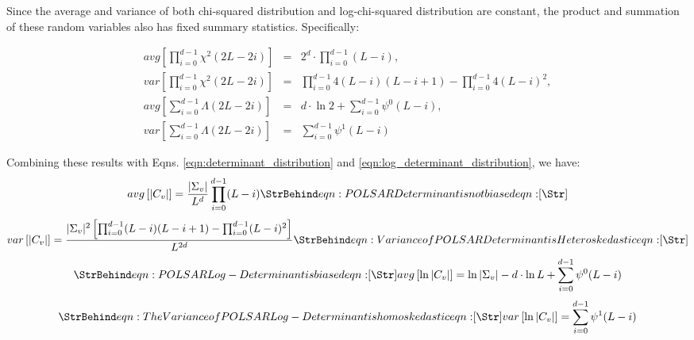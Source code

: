 Since the average and variance of both chi-squared distribution and log-chi-squared distribution are constant,
  the product and summation of these random variables also has fixed summary statistics.
Specifically:

\begin{eqnarray}
  avg \left[ \prod^{d-1}_{i=0} \chi^2(2L-2i) \right] &=& 2^d \cdot \prod^{d-1}_{i=0} (L-i), \\
  var \left[ \prod^{d-1}_{i=0} \chi^2(2L-2i) \right] &=& \prod^{d-1}_{i=0} 4(L-i)(L-i+1) - \prod^{d-1}_{i=0} 4(L-i)^2, \\
  avg \left[ \sum^{d-1}_{i=0} \Lambda(2L-2i) \right] &=& d \cdot \ln{2} + \sum^{d-1}_{i=0} \psi^0(L-i), \\
  var \left[ \sum^{d-1}_{i=0} \Lambda(2L-2i) \right] &=& \sum^{d-1}_{i=0} \psi^1(L-i)
\end{eqnarray}

Combining these results with Eqns. \ref{eqn:determinant_distribution} and \ref{eqn:log_determinant_distribution}, we have:
\begin{equation}
avg \left[ |C_v| \right]  = \frac{|\Sigma_v|}{L^d} \prod^{d-1}_{i=0} (L-i)
\label{eqn:POLSAR Determinant is not biased}
\caption{eqn:POLSAR Determinant is not biased}
\end{equation}
\begin{equation}
  var \left[ |C_v| \right]  =   \frac{|\Sigma_v|^2 \left[ \prod^{d-1}_{i=0} (L-i)(L-i+1) - \prod^{d-1}_{i=0} (L-i)^2 \right] }{L^{2d}}
  \label{eqn:var_det_is_heteroskedastic}
  \caption{eqn:Variance of POLSAR Determinant is Heteroskedastic}
\end{equation}
\begin{equation}
  \label{eqn:avg_log_det}
  \caption{eqn:POLSAR Log-Determinant is biased}
  avg \left[ \ln |C_v| \right] = \ln |\Sigma_v| - d \cdot \ln{L}  + \sum^{d-1}_{i=0} \psi^0(L-i)  
\end{equation}
\begin{equation}
  \label{eqn:var_log_det_is_homoskedastic}
  \caption{eqn:The Variance of POLSAR Log-Determinant is homoskedastic}
  var \left[ \ln |C_v| \right] =  \sum^{d-1}_{i=0} \psi^1(L-i)
\end{equation}

